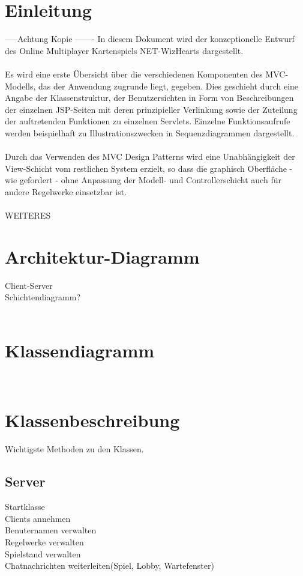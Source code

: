 \documentclass{article}
\begin{document}
\tableofcontents
\newpage

\section{Einleitung}
-----Achtung Kopie -------
In diesem Dokument wird der konzeptionelle Entwurf des Online Multiplayer Kartenspiels NET-WizHearts dargestellt.\\
\ \\
Es wird eine erste Übersicht über die verschiedenen Komponenten des MVC-
Modells, das der Anwendung zugrunde liegt, gegeben. Dies geschieht durch eine
Angabe der Klassenstruktur, der Benutzersichten in Form von Beschreibungen
der einzelnen JSP-Seiten mit deren prinzipieller Verlinkung sowie der Zuteilung
der auftretenden Funktionen zu einzelnen Servlets. Einzelne Funktionsaufrufe
werden beispielhaft zu Illustrationszwecken in Sequenzdiagrammen dargestellt.\\
\ \\
Durch das Verwenden des MVC Design Patterns wird eine Unabhängigkeit der View-Schicht 
vom restlichen System erzielt, so dass die graphisch Oberfläche - wie gefordert - ohne Anpassung 
der Modell- und Controllerschicht auch für andere Regelwerke einsetzbar ist.\\
\  \\
WEITERES
\ \\
\section{Architektur-Diagramm}
Client-Server \\
Schichtendiagramm? \\
\ \\ 
\section{Klassendiagramm}
\ \\
\section{Klassenbeschreibung}
Wichtigste Methoden zu den Klassen.
	\subsection{Server}
		Startklasse \\
		Clients annehmen \\
		Benuternamen verwalten \\
		Regelwerke verwalten \\
		Spielstand verwalten \\
		Chatnachrichten weiterleiten(Spiel, Lobby, Wartefenster) \\
\end{document}

